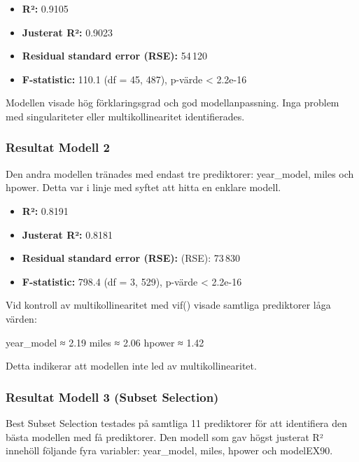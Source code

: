 \documentclass[
  letterpaper,
  DIV=11,
  numbers=noendperiod]{scrreprt}
\providecommand{\tightlist}{%
  \setlength{\itemsep}{0pt}\setlength{\parskip}{0pt}}\usepackage{longtable,booktabs,array}
\begin{document}
\begin{itemize}
\tightlist
\item
  \textbf{R²:} 0.9105
\item
  \textbf{Justerat R²:} 0.9023
\item
  \textbf{Residual standard error (RSE):} 54\,120
\item
  \textbf{F-statistic:} 110.1 (df = 45, 487), p-värde \textless{}
  2.2e-16
\end{itemize}

Modellen visade hög förklaringsgrad och god modellanpassning. Inga
problem med singulariteter eller multikollinearitet identifierades.

\subsubsection{Resultat Modell 2}\label{resultat-modell-2}

Den andra modellen tränades med endast tre prediktorer: year\_model,
miles och hpower. Detta var i linje med syftet att hitta en enklare
modell.

\begin{itemize}
\tightlist
\item
  \textbf{R²:} 0.8191
\item
  \textbf{Justerat R²:} 0.8181
\item
  \textbf{Residual standard error (RSE):} (RSE): 73\,830
\item
  \textbf{F-statistic:} 798.4 (df = 3, 529), p-värde \textless{} 2.2e-16
\end{itemize}

Vid kontroll av multikollinearitet med vif() visade samtliga prediktorer
låga värden:

year\_model ≈ 2.19 miles ≈ 2.06 hpower ≈ 1.42

Detta indikerar att modellen inte led av multikollinearitet.

\subsubsection{Resultat Modell 3 (Subset
Selection)}\label{resultat-modell-3-subset-selection}

Best Subset Selection testades på samtliga 11 prediktorer för att
identifiera den bästa modellen med få prediktorer. Den modell som gav
högst justerat R² innehöll följande fyra variabler: year\_model, miles,
hpower och modelEX90.
\end{document}
